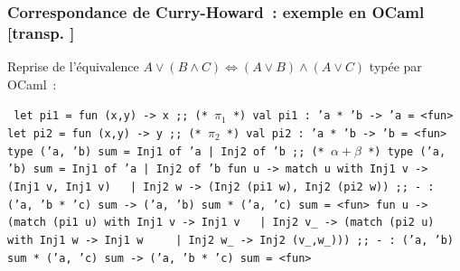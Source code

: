 \documentclass[mathserif,a4paper,aspectratio=169]{beamer}
\renewcommand{\frametitle}[1]{\subsubsection*{#1 {\footnotesize[transp. \insertframenumber]}}}
\begin{document}
\begin{frame}
\frametitle{Correspondance de Curry-Howard : exemple en OCaml}

Reprise de l'équivalence $A\lor(B\land C) \Leftrightarrow (A\lor
B)\land (A\lor C)$ typée par OCaml :

\bigskip

{\footnotesize\tt
let pi1 = fun (x,y) -> x ;; (* $\pi_1$ *)\newline
{\color{purple}val pi1 : 'a * 'b -> 'a = <fun>}\newline
let pi2 = fun (x,y) -> y ;; (* $\pi_2$ *)\newline
{\color{purple}val pi2 : 'a * 'b -> 'b = <fun>}\newline
type ('a, 'b) sum = Inj1 of 'a | Inj2 of 'b ;; (* $\alpha+\beta$ *)\newline
{\color{purple}type ('a, 'b) sum = Inj1 of 'a | Inj2 of 'b}\newline
fun u -> match u with Inj1 v -> (Inj1 v, Inj1 v)\newline
\ \ | Inj2 w -> (Inj2 (pi1 w), Inj2 (pi2 w)) ;;\newline
{\color{purple}- : ('a, 'b * 'c) sum -> ('a, 'b) sum * ('a, 'c) sum = <fun>}\newline
fun u -> (match (pi1 u) with Inj1 v -> Inj1 v\newline
\ \ | Inj2 v\_ -> (match (pi2 u) with Inj1 w -> Inj1 w\newline
\ \ \ \ | Inj2 w\_ -> Inj2 (v\_,w\_))) ;;\newline
{\color{purple}- : ('a, 'b) sum * ('a, 'c) sum -> ('a, 'b * 'c) sum = <fun>}
\par}

\end{frame}
%
\end{document}
